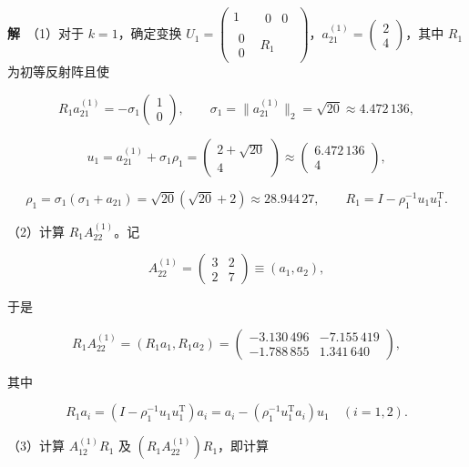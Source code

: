 \documentclass[
  10pt,
  fontset=fandol]{ctexart}
\begin{document}
\textbf{解}　（1）对于 \(k=1\)，确定变换 \(U_1=\begin{pmatrix}1&\begin{matrix}0&0\end{matrix}\\\begin{matrix}0\\0\end{matrix}&R_1\end{pmatrix}\)，\(a_{21}^{(1)}=\begin{pmatrix}2\\4\end{pmatrix}\)，其中 \(R_1\) 为初等反射阵且使

\[
R_1a_{21}^{(1)}=-\sigma_1\begin{pmatrix}1\\0\end{pmatrix},\qquad
\sigma_1=\|a_{21}^{(1)}\|_2=\sqrt{20}\approx4.472\,136,
\]

\[
u_1=a_{21}^{(1)}+\sigma_1\rho_1=\begin{pmatrix}2+\sqrt{20}\\4\end{pmatrix}
\approx\begin{pmatrix}6.472\,136\\4\end{pmatrix},
\]

\[
\rho_1=\sigma_1(\sigma_1+a_{21})=\sqrt{20}(\sqrt{20}+2)\approx28.944\,27,\qquad
R_1=I-\rho_1^{-1}u_1u_1^{\mathrm T}.
\]

（2）计算 \(R_1A_{22}^{(1)}\)。记

\[
A_{22}^{(1)}=\begin{pmatrix}3&2\\2&7\end{pmatrix}\equiv(a_1,a_2),
\]

于是

\[
R_1A_{22}^{(1)}=(R_1a_1,R_1a_2)
=\begin{pmatrix}-3.130\,496&-7.155\,419\\-1.788\,855&1.341\,640\end{pmatrix},
\]

其中

\[
R_1a_i=(I-\rho_1^{-1}u_1u_1^{\mathrm T})a_i
=a_i-(\rho_1^{-1}u_1^{\mathrm T}a_i)u_1\quad(i=1,2).
\]

（3）计算 \(A_{12}^{(1)}R_1\) 及 \((R_1A_{22}^{(1)})R_1\)，即计算
\end{document}
